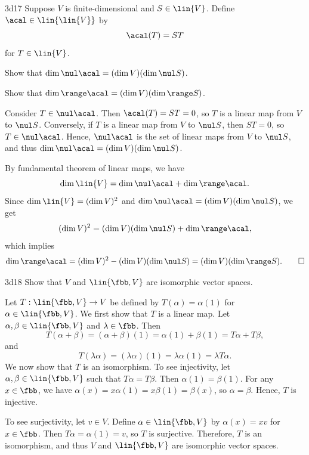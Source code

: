 \begin{exercise}{3d17}
    Suppose $V$ is finite-dimensional and $S \in \lin{V}$.
	Define $\acal \in \lin{\lin{V}}$ by
    \[
    	\acal(T) = ST
    \]
    for $T \in \lin{V}$.
    \begin{subexercises}
        \item Show that $\dim \nul \acal = (\dim V)(\dim \nul S)$.
        \item Show that $\dim \range \acal = (\dim V)(\dim \range S)$.
    \end{subexercises}
\end{exercise}

\begin{solenum}
    \item Consider $T \in \nul \acal$.
	Then $\acal(T) = ST = 0$, so $T$ is a linear map from $V$ to $\nul S$.
	Conversely, if $T$ is a linear map from $V$ to $\nul S$, then $ST = 0$, so $T \in \nul \acal$.
	Hence, $\nul \acal$ is the set of linear maps from $V$ to $\nul S$, and thus $\dim \nul \acal = (\dim V)(\dim \nul S)$.
    \item By fundamental theorem of linear maps, we have
    \[
    	\dim \lin{V} = \dim \nul \acal + \dim \range \acal.
    \]
    Since $\dim \lin{V} = (\dim V)^2$ and $\dim \nul \acal = (\dim V)(\dim \nul S)$, we get
    \[
    	(\dim V)^2 = (\dim V)(\dim \nul S) + \dim \range \acal,
    \]
    which implies
    \[
    	\dim \range \acal = (\dim V)^2 - (\dim V)(\dim \nul S) = (\dim V)(\dim \range S). \qedhere
    \]
\end{solenum}

\begin{exercise}{3d18}
    Show that $V$ and $\lin{\fbb, V}$ are isomorphic vector spaces.
\end{exercise}

\begin{sol}
    Let $T : \lin{\fbb, V} \to V$ be defined by $T(\alpha) = \alpha(1)$ for $\alpha \in \lin{\fbb, V}$.
	We first show that $T$ is a linear map.
	Let $\alpha, \beta \in \lin{\fbb, V}$ and $\lambda \in \fbb$.
	Then
    \[
    	T(\alpha + \beta) = (\alpha + \beta)(1) = \alpha(1) + \beta(1) = T\alpha + T\beta,
    \]
    and
    \[
    	T(\lambda \alpha) = (\lambda \alpha)(1) = \lambda \alpha(1) = \lambda T\alpha.
    \]
    We now show that $T$ is an isomorphism.
	To see injectivity, let $\alpha, \beta \in \lin{\fbb, V}$ such that $T\alpha = T\beta$.
	Then $\alpha(1) = \beta(1)$.
	For any $x \in \fbb$, we have $\alpha(x) = x\alpha(1) = x\beta(1) = \beta(x)$, so $\alpha = \beta$.
	Hence, $T$ is injective.

    To see surjectivity, let $v \in V$.
	Define $\alpha \in \lin{\fbb, V}$ by $\alpha(x) = xv$ for $x \in \fbb$.
	Then $T\alpha = \alpha(1) = v$, so $T$ is surjective.
	Therefore, $T$ is an isomorphism, and thus $V$ and $\lin{\fbb, V}$ are isomorphic vector spaces.
\end{sol}

